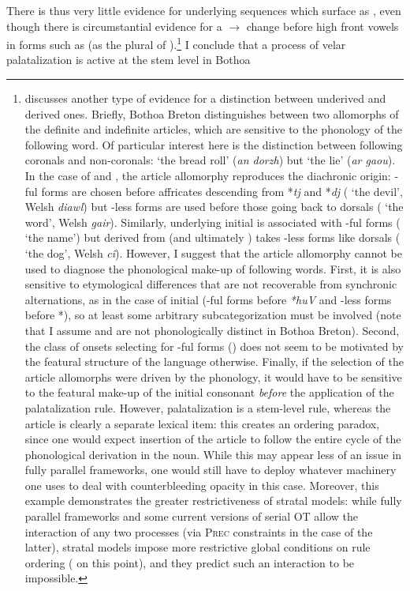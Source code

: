 There is thus very little evidence for underlying  sequences which surface as \ipa{[dʒi]}, even though there is circumstantial evidence for a $\rightarrow$ change before high front vowels in forms such as \ipa{[ˈdʒisti]} (as the plural of \ipa{[ˈɡast]}).\footnote{\label{fn:article-allomorphy}\citet{humphreys95:_phonol_bothoa_saint_nicol_pelem} discusses another type of evidence for a distinction between underived \ipa{[ʧ~dʒ]} and derived ones. Briefly, Bothoa Breton distinguishes between two allomorphs of the definite and indefinite articles, which are sensitive to the phonology of the following word. Of particular interest here is the distinction between following coronals and non-coronals: \ipa{[ən ˈdɒrz̥]} `the bread roll' (\emph{an dorzh}) but \ipa{[ə ˈɡəw]} `the lie' (\emph{ar gaou}). In the case of \ipa{[ʧ]} and \ipa{[dʒ]}, the article allomorphy reproduces the diachronic origin: \ipa{[n]}-ful forms are chosen before affricates descending from *\emph{tj} and *\emph{dj} (\ipa{[ən ˈdʒəwl]} `the devil', \cf Welsh \emph{diawl}) but \ipa{[n]}-less forms are used before those going back to dorsals (\ipa{[ə ˈdʒiːr]} `the word', \cf Welsh \emph{gair}). Similarly, underlying initial \ipa{[h]} is associated with \ipa{[n]}-ful forms (\ipa{[ən ˈhãw̃n]} `the name') but \ipa{[h]} derived from \ipa{[ʧ]} (and ultimately \ipa{[k]}) takes \ipa{[n]}-less forms like dorsals (\ipa{[ə ˈhiː]} `the dog', \cf Welsh \emph{cî}). However, I suggest that the article allomorphy cannot be used to diagnose the phonological make-up of following words. First, it is also sensitive to etymological differences that are not recoverable from synchronic alternations, as in the case of initial \ipa{[hw]} (\ipa{[n]}-ful forms before \emph{*huV} and \ipa{[n]}-less forms before *\emph{}), so at least some arbitrary subcategorization must be involved (note that I assume \ipa{[w]} and \ipa{[u]} are not phonologically distinct in Bothoa Breton). Second, the class of onsets selecting for \ipa{[n]}-ful forms (\ipa{[t~d~$\emptyset$~h~w]}) does not seem to be motivated by the featural structure of the language otherwise. Finally, if the selection of the article allomorphs were driven by the phonology, it would have to be sensitive to the featural make-up of the initial consonant \emph{before} the application of the palatalization rule. However, palatalization is a stem-level rule, whereas the article is clearly a separate lexical item: this creates an ordering paradox, since one would expect insertion of the article to follow the entire cycle of the phonological derivation in the noun. While this may appear less of an issue in fully parallel frameworks, one would still have to deploy whatever machinery one uses to deal with counterbleeding opacity in this case. Moreover, this example demonstrates the greater restrictiveness of stratal models: while fully parallel frameworks and some current versions of serial OT allow the interaction of any two processes (\eg via \textsc{Prec} constraints in the case of the latter), stratal models impose more restrictive global conditions on rule ordering (\citealp[\cf][]{kiparsky11:_chain} on this point), and they predict such an interaction to be impossible.} I conclude that a process of velar palatalization is active at the stem level in Bothoa 